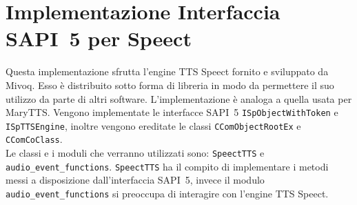 \section{Implementazione Interfaccia SAPI~5 per Speect}
Questa implementazione sfrutta l'engine TTS Speect fornito e sviluppato da Mivoq. Esso è distribuito sotto forma di libreria in modo da permettere il suo utilizzo da parte di altri software.
L'implementazione è analoga a quella usata per MaryTTS. Vengono implementate le interfacce SAPI~5 \texttt{ISpObjectWithToken} e \texttt{ISpTTSEngine}, inoltre vengono ereditate le classi \texttt{CComObjectRootEx} e\\\texttt{CComCoClass}.\\
Le classi e i moduli che verranno utilizzati sono: \texttt{SpeectTTS} e \texttt{audio\_event\_functions}.
\texttt{SpeectTTS} ha il compito di implementare i metodi messi a disposizione dall'interfaccia SAPI~5, invece il modulo \texttt{audio\_event\_functions} si preoccupa di interagire con l'engine TTS Speect.
